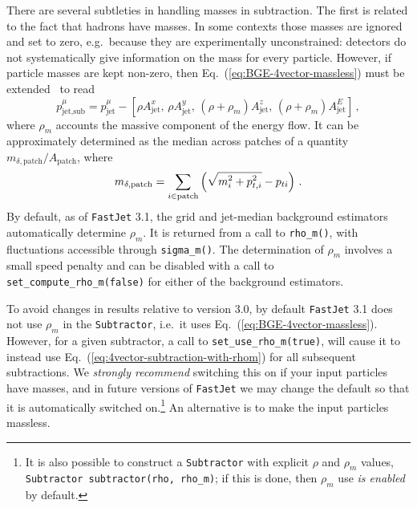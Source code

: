 \documentclass[12pt,a4]{article}
\newcommand{\fastjet}{\texttt{FastJet}\xspace}
\newcommand{\ttt}[1]{{\small\texttt{#1}}}
\begin{document}
There are several subtleties in handling masses in
subtraction. 
%
The first is related to the fact that hadrons have
masses.
%
In some contexts those masses are ignored and set to zero, e.g.\
because they are experimentally unconstrained: detectors do not
systematically give information on the mass for every particle.
%
However, if particle masses are kept non-zero, then
Eq.~(\ref{eq:BGE-4vector-massless}) must be
extended~\cite{Soyez:2012hv} to read
\begin{equation}
  \label{eq:4vector-subtraction-with-rhom}
  p^\mu_\text{jet,sub} = 
  p^\mu_\text{jet}  
  - [\rho A^x_\text{jet}, \,
     \rho A^y_\text{jet}, \,
     (\rho+\rho_m) A^z_\text{jet}, \,
     (\rho+\rho_m) A^E_\text{jet}
     ]\,,
\end{equation}
where $\rho_m$ accounts the massive component of the energy flow. 
%
It can be approximately determined as the median across patches of a
quantity $m_{\delta,\text{patch}}/A_{\text{patch}}$, where
\begin{equation}
  \label{eq:m-delta}
  m_{\delta,\text{patch}} = \sum_{i\in\text{patch}}
  \left(\sqrt{\smash[b]{m^2_{i} + p_{t,i}^2}} - p_{ti}\right)\,.
\end{equation}
By default, as of \fastjet 3.1, the grid and jet-median background
estimators automatically determine $\rho_m$. 
%
It is returned from a call to \ttt{rho\_m()}, with fluctuations
accessible through \ttt{sigma\_m()}.
%
The determination of $\rho_m$ involves a small speed penalty and can
be disabled with a call to \ttt{set\_compute\_rho\_m(false)} for
either of the background estimators.

To avoid changes in results relative to version 3.0, by default
\fastjet 3.1 does not use $\rho_m$ in the \ttt{Subtractor}, i.e.\ it
uses Eq.~(\ref{eq:BGE-4vector-massless}).
%
However, for a given subtractor, a call to
\ttt{set\_use\_rho\_m(true)}, will cause it to instead use
Eq.~(\ref{eq:4vector-subtraction-with-rhom}) for all subsequent
subtractions.
%
We \emph{strongly recommend} switching this on if your input particles
have masses, and in future versions of \fastjet we may change the
default so that it is automatically switched on.\footnote{It is also
  possible to construct a \texttt{Subtractor} with explicit $\rho$ and
  $\rho_m$ values, \texttt{Subtractor subtractor(rho, rho\_m)}; if
  this is done, then $\rho_m$ use \emph{is enabled} by default.}
%
An alternative is to make the input particles massless.
\end{document}
